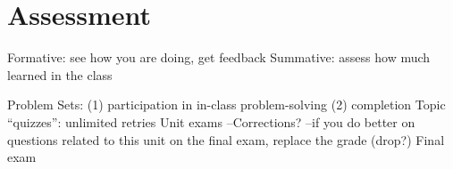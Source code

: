 \section{Assessment}

Formative: see how you are doing, get feedback
Summative: assess how much learned in the class


Problem Sets: (1) participation in in-class problem-solving (2) completion
Topic ``quizzes'': unlimited retries
Unit exams
--Corrections?
--if you do better on questions related to this unit on the final exam, replace the grade (drop?)
Final exam
